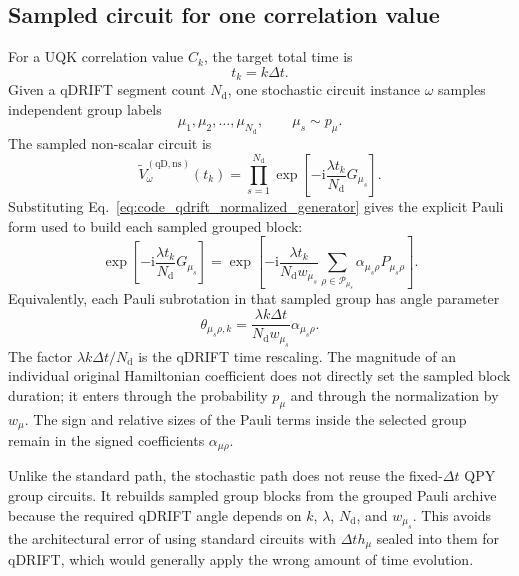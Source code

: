 \documentclass[11pt]{article}
\newcommand{\ii}{\mathrm{i}}
\begin{document}
\subsection{Sampled circuit for one correlation value}

For a UQK correlation value $C_k$, the target total time is
\begin{equation}
    t_k=k\Delta t.
\end{equation}
Given a qDRIFT segment count $N_{\mathrm{d}}$, one stochastic circuit instance $\omega$ samples independent group labels
\begin{equation}
    \mu_1,\mu_2,\ldots,\mu_{N_{\mathrm{d}}},
    \qquad
    \mu_s\sim p_\mu.
\end{equation}
The sampled non-scalar circuit is
\begin{equation}
    \widetilde{V}^{\mathrm{(qD,ns)}}_{\omega}(t_k)
    =
    \prod_{s=1}^{N_{\mathrm{d}}}
    \exp\left[
        -\ii\frac{\lambda t_k}{N_{\mathrm{d}}}
        G_{\mu_s}
    \right].
    \label{eq:code_qdrift_sampled_chunk}
\end{equation}
Substituting Eq.~\eqref{eq:code_qdrift_normalized_generator} gives the explicit Pauli form used to build each sampled grouped block:
\begin{equation}
    \exp\left[
        -\ii\frac{\lambda t_k}{N_{\mathrm{d}}}
        G_{\mu_s}
    \right]
    =
    \exp\left[
        -\ii\frac{\lambda t_k}{N_{\mathrm{d}}w_{\mu_s}}
        \sum_{\rho\in\mathcal{P}_{\mu_s}}
        \alpha_{\mu_s\rho}P_{\mu_s\rho}
    \right].
    \label{eq:code_qdrift_pauli_block}
\end{equation}
Equivalently, each Pauli subrotation in that sampled group has angle parameter
\begin{equation}
    \theta_{\mu_s\rho,k}
    =
    \frac{\lambda k\Delta t}{N_{\mathrm{d}}w_{\mu_s}}
    \alpha_{\mu_s\rho}.
\end{equation}
The factor $\lambda k\Delta t/N_{\mathrm{d}}$ is the qDRIFT time rescaling.  The magnitude of an individual original Hamiltonian coefficient does not directly set the sampled block duration; it enters through the probability $p_\mu$ and through the normalization by $w_\mu$.  The sign and relative sizes of the Pauli terms inside the selected group remain in the signed coefficients $\alpha_{\mu\rho}$.

Unlike the standard path, the stochastic path does not reuse the fixed-$\Delta t$ QPY group circuits.  It rebuilds sampled group blocks from the grouped Pauli archive because the required qDRIFT angle depends on $k$, $\lambda$, $N_{\mathrm{d}}$, and $w_{\mu_s}$.  This avoids the architectural error of using standard circuits with $\Delta t h_\mu$ sealed into them for qDRIFT, which would generally apply the wrong amount of time evolution.
\end{document}
